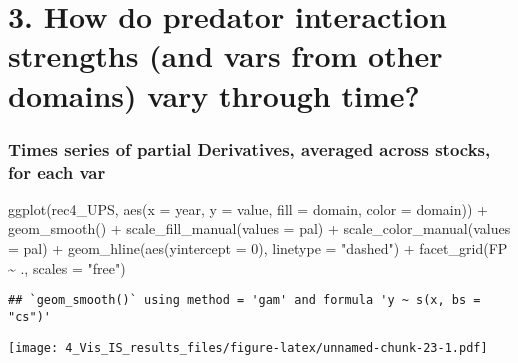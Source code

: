 \documentclass[
]{article}
\newenvironment{Shaded}{\begin{snugshade}}{\end{snugshade}}
\newcommand{\AttributeTok}[1]{\textcolor[rgb]{0.77,0.63,0.00}{#1}}
\newcommand{\DecValTok}[1]{\textcolor[rgb]{0.00,0.00,0.81}{#1}}
\newcommand{\FunctionTok}[1]{\textcolor[rgb]{0.00,0.00,0.00}{#1}}
\newcommand{\NormalTok}[1]{#1}
\newcommand{\SpecialCharTok}[1]{\textcolor[rgb]{0.00,0.00,0.00}{#1}}
\newcommand{\StringTok}[1]{\textcolor[rgb]{0.31,0.60,0.02}{#1}}
\begin{document}
\hypertarget{how-do-predator-interaction-strengths-and-vars-from-other-domains-vary-through-time-2}{%
\section{3. How do predator interaction strengths (and vars from other
domains) vary through
time?}\label{how-do-predator-interaction-strengths-and-vars-from-other-domains-vary-through-time-2}}

\hypertarget{times-series-of-partial-derivatives-averaged-across-stocks-for-each-var-2}{%
\subsubsection{Times series of partial Derivatives, averaged across
stocks, for each
var}\label{times-series-of-partial-derivatives-averaged-across-stocks-for-each-var-2}}

\begin{Shaded}
\begin{Highlighting}[]
\FunctionTok{ggplot}\NormalTok{(rec4\_UPS, }\FunctionTok{aes}\NormalTok{(}\AttributeTok{x =}\NormalTok{ year, }\AttributeTok{y =}\NormalTok{ value, }\AttributeTok{fill =}\NormalTok{ domain, }\AttributeTok{color =}\NormalTok{ domain)) }\SpecialCharTok{+}
  \FunctionTok{geom\_smooth}\NormalTok{() }\SpecialCharTok{+}
  \FunctionTok{scale\_fill\_manual}\NormalTok{(}\AttributeTok{values =}\NormalTok{ pal) }\SpecialCharTok{+}
  \FunctionTok{scale\_color\_manual}\NormalTok{(}\AttributeTok{values =}\NormalTok{ pal) }\SpecialCharTok{+}
    \FunctionTok{geom\_hline}\NormalTok{(}\FunctionTok{aes}\NormalTok{(}\AttributeTok{yintercept =} \DecValTok{0}\NormalTok{),}
             \AttributeTok{linetype =} \StringTok{"dashed"}\NormalTok{) }\SpecialCharTok{+} 
  \FunctionTok{facet\_grid}\NormalTok{(FP }\SpecialCharTok{\textasciitilde{}}\NormalTok{ ., }\AttributeTok{scales =} \StringTok{"free"}\NormalTok{)}
\end{Highlighting}
\end{Shaded}

\begin{verbatim}
## `geom_smooth()` using method = 'gam' and formula 'y ~ s(x, bs = "cs")'
\end{verbatim}

\texttt{[image: 4\_Vis\_IS\_results\_files/figure-latex/unnamed-chunk-23-1.pdf]}
\end{document}
